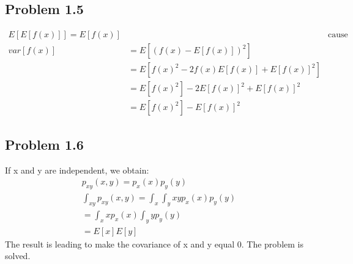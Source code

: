 \documentclass[12pt]{article}
\begin{document}
    \subsection*{Problem 1.5}
    \begin{align*}
        E[E[f(x)]] = E[f(x)] && \text{cause E[f(x)] is constant} \\
        var[f(x)] & = E[(f(x) - E[f(x)])^2] \\
        & = E[f(x)^2 - 2f(x)E[f(x)] + E[f(x)]^2] \\
        & = E[f(x)^2] - 2E[f(x)]^2 + E[f(x)]^2 \\
        & = E[f(x)^2] - E[f(x)]^2
    \end{align*}
    
    \subsection*{Problem 1.6}
    If x and y are independent, we obtain:
    \begin{align*}
        p_{xy}(x,y) = p_x(x)p_y(y) \\
        \int_{xy}p_{xy}(x,y) = \int_{x}\int_{y}xyp_x(x)p_y(y) \\
        = \int_{x}xp_x(x)\int_{y}yp_y(y) \\
        = E[x]E[y]
    \end{align*}
    The result is leading to make the covariance of x and y equal 0. The problem is solved.
\end{document}
